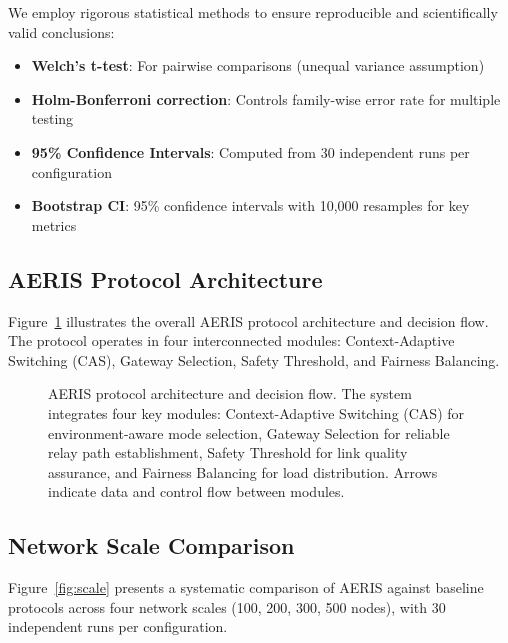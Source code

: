 \documentclass[sensors,article,submit,moreauthors,pdftex]{Definitions/mdpi}
\begin{document}
We employ rigorous statistical methods to ensure reproducible and scientifically valid conclusions:
\begin{itemize}
\item \textbf{Welch's t-test}: For pairwise comparisons (unequal variance assumption)
\item \textbf{Holm-Bonferroni correction}: Controls family-wise error rate for multiple testing
\item \textbf{95\% Confidence Intervals}: Computed from 30 independent runs per configuration
\item \textbf{Bootstrap CI}: 95\% confidence intervals with 10,000 resamples for key metrics
\end{itemize}

\subsection{AERIS Protocol Architecture}

Figure~\ref{fig:architecture} illustrates the overall AERIS protocol architecture and decision flow. The protocol operates in four interconnected modules: Context-Adaptive Switching (CAS), Gateway Selection, Safety Threshold, and Fairness Balancing.

\begin{figure}[H]
\centering
\caption{AERIS protocol architecture and decision flow. The system integrates four key modules: Context-Adaptive Switching (CAS) for environment-aware mode selection, Gateway Selection for reliable relay path establishment, Safety Threshold for link quality assurance, and Fairness Balancing for load distribution. Arrows indicate data and control flow between modules.}
\label{fig:architecture}
\end{figure}

\subsection{Network Scale Comparison}

Figure~\ref{fig:scale} presents a systematic comparison of AERIS against baseline protocols across four network scales (100, 200, 300, 500 nodes), with 30 independent runs per configuration.
\end{document}
